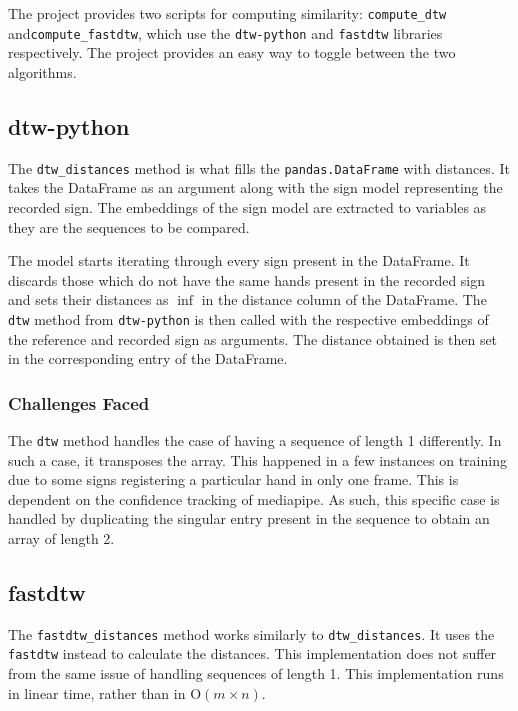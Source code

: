 \documentclass[final,dissertation.tex]{subfiles}
\begin{document}
The project provides two scripts for computing similarity: \verb|compute_dtw| and\newline \verb|compute_fastdtw|, which use the \verb|dtw-python| and \verb|fastdtw| libraries respectively. The project provides an easy way to toggle between the two algorithms.

\subsection{dtw-python}

The \verb|dtw_distances| method is what fills the \verb|pandas.DataFrame| with distances. It takes the DataFrame as an argument along with the sign model representing the recorded sign. The embeddings of the sign model are extracted to variables as they are the sequences to be compared.

The model starts iterating through every sign present in the DataFrame. It discards those which do not have the same hands present in the recorded sign and sets their distances as $\inf$ in the distance column of the DataFrame. The \verb|dtw| method from \verb|dtw-python| \cite{giorgino2009computing} is then called with the respective embeddings of the reference and recorded sign as arguments. The distance obtained is then set in the corresponding entry of the DataFrame.


\subsubsection{Challenges Faced}

The \verb|dtw| method handles the case of having a sequence of length 1 differently. In such a case, it transposes the array. This happened in a few instances on training due to some signs registering a particular hand in only one frame. This is dependent on the confidence tracking of mediapipe. As such, this specific case is handled by duplicating the singular entry present in the sequence to obtain an array of length 2.

\subsection{fastdtw}

The \verb|fastdtw_distances| method works similarly to \verb|dtw_distances|. It uses the \verb|fastdtw| instead to calculate the distances. This implementation does not suffer from the same issue of handling sequences of length 1. This implementation runs in linear time, rather than in O$(m \times n)$.
\end{document}
